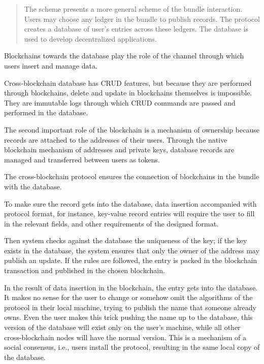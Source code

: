 \begin{multicols}{2}
\begin{quote}
The scheme presents a more general scheme of the bundle interaction. Users may choose any ledger in the bundle to publish records. The protocol creates a database of user’s entries across these ledgers. The database is used to develop decentralized applications. 
\end{quote}

\vspace{-.35cm}

Blockchains towards the database play the role of the channel through which users insert and manage data.
 
Cross-blockchain database has CRUD features, but because they are performed through blockchains, delete and update in blockchains themselves is impossible. They are immutable logs through which CRUD commands are passed and performed in the database.

The second important role of the blockchain is a mechanism of ownership because records are attached to the addresses of their users. Through the native blockchain mechanism of addresses and private keys, database records are managed and transferred between users as tokens.

The cross-blockchain protocol ensures the connection of blockchains in the bundle with the database.

To make sure the record gets into the database, data insertion accompanied with protocol format, for instance, key-value record entries will require the user to fill in the relevant fields, and other requirements of the designed format.

Then system checks against the database the uniqueness of the key; if the key exists in the database, the system ensures that only the owner of the address may publish an update. If the rules are followed, the entry is packed in the blockchain transaction and published in the chosen blockchain.

In the result of data insertion in the blockchain, the entry gets into the database. It makes no sense for the user to change or somehow omit the algorithms of the protocol in their local machine, trying to publish the name that someone already owns. Even the user makes this trick pushing the name up to the database, this version of the database will exist only on the user’s machine, while all other cross-blockchain nodes will have the normal version. This is a mechanism of a social consensus, i.e., users install the protocol, resulting in the same local copy of the database.


\end{multicols}
